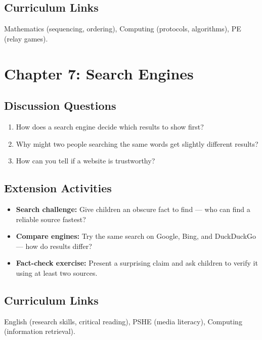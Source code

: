 \subsection*{Curriculum Links}
Mathematics (sequencing, ordering), Computing (protocols, algorithms), PE (relay games).

\sectionrule

\section*{Chapter 7: Search Engines}

\subsection*{Discussion Questions}
\begin{enumerate}
  \item How does a search engine decide which results to show first?
  \item Why might two people searching the same words get slightly different results?
  \item How can you tell if a website is trustworthy?
\end{enumerate}

\subsection*{Extension Activities}
\begin{itemize}
  \item \textbf{Search challenge:} Give children an obscure fact to find — who can find a reliable source fastest?
  \item \textbf{Compare engines:} Try the same search on Google, Bing, and DuckDuckGo — how do results differ?
  \item \textbf{Fact-check exercise:} Present a surprising claim and ask children to verify it using at least two sources.
\end{itemize}

\subsection*{Curriculum Links}
English (research skills, critical reading), PSHE (media literacy), Computing (information retrieval).

\sectionrule

